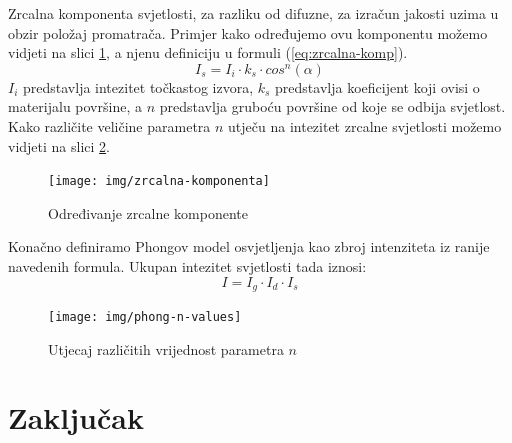 \documentclass[times, utf8, diplomskirad]{fer}
\begin{document}
Zrcalna komponenta svjetlosti, za razliku od difuzne, za izračun jakosti uzima u obzir položaj promatrača.
Primjer kako određujemo ovu komponentu možemo vidjeti na slici \ref{fig:zrcalna-svjetlost}, a njenu definiciju u formuli (\ref{eq:zrcalna-komp}).
\begin{equation}
    I_s = I_i \cdot k_s \cdot cos^n(\alpha)
    \label{eq:zrcalna-komp}
\end{equation}
$I_i$ predstavlja intezitet točkastog izvora, $k_s$ predstavlja koeficijent koji ovisi o materijalu površine, a $n$ predstavlja gruboću površine od koje se odbija svjetlost.
Kako različite veličine parametra $n$ utječu na intezitet zrcalne svjetlosti možemo vidjeti na slici \ref{fig:phong-n-param}.
\begin{figure}[H]
    \centering
    \texttt{[image: img/zrcalna-komponenta]}
    \caption{Određivanje zrcalne komponente}
    \label{fig:zrcalna-svjetlost}
\end{figure}

\newpage
Konačno definiramo Phongov model osvjetljenja kao zbroj intenziteta iz ranije navedenih formula.
Ukupan intezitet svjetlosti tada iznosi:
\begin{equation}
    I = I_g \cdot I_d \cdot I_s
    \label{eq:phong-svjetlost}
\end{equation}

\begin{figure}[H]
    \centering
    \texttt{[image: img/phong-n-values]}
    \caption{Utjecaj različitih vrijednost parametra $n$}
    \label{fig:phong-n-param}
\end{figure}

\chapter{Zaključak}
\label{pog:zakljucak}





\end{document}
